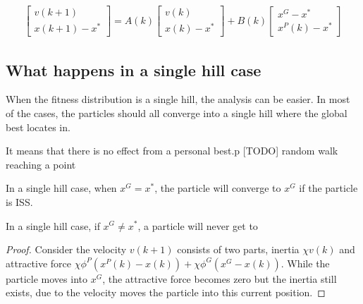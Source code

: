 \begin{equation}
\label{eq:rel_opt}
\begin{aligned}
\begin{bmatrix}
v(k+1) \\
x(k+1) - x^{*}
\end{bmatrix}
 = A(k) 
\begin{bmatrix}
v(k) \\
x(k) - x^{*}
\end{bmatrix}
+ B(k) 
\begin{bmatrix}
x^{G} - x^{*} \\
x^{P}(k) - x^{*}
\end{bmatrix}
\end{aligned}
\end{equation}



\subsection{What happens in a single hill case}

When the fitness distribution is a single hill, the analysis can be easier.
In most of the cases, the particles should all converge into a single hill where the global best locates in.



It means that there is no effect from a personal best.p
[TODO] random walk reaching a point


\begin{mylem}
In a single hill case, when $ x^{G} = x^{*} $, the particle will converge to $ x^{G} $ if the particle is ISS.
\end{mylem}

\begin{mylem}
In a single hill case, if $ x^{G} \not = x^{*} $, a particle will never get to 
\begin{proof}
Consider the velocity $ v(k+1) $ consists of two parts, inertia $ \chi v(k) $ and attractive force $ \chi \phi^{P} (x^{P}(k) - x(k) ) + \chi \phi^{G} ( x^{G} - x(k) ) $.
While the particle moves into $ x^{G} $, the attractive force becomes zero but the inertia still exists, due to the velocity moves the particle into this current position.
\end{proof} 
\end{mylem}

